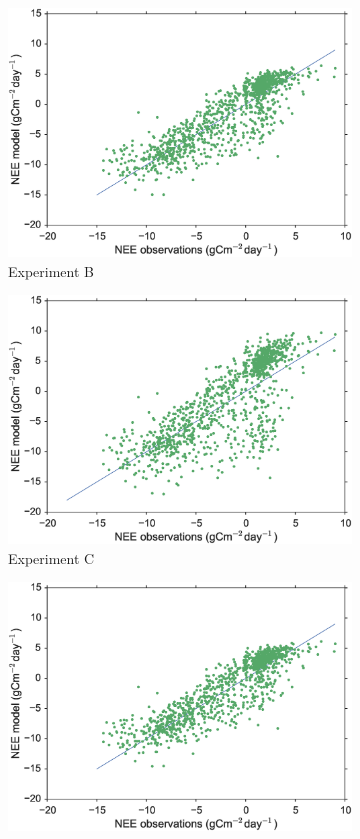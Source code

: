 \documentclass[review]{elsarticle}
\begin{document}
\begin{figure}
\begin{subfigure}[b]{0.49\textwidth}
        \includegraphics[width=\textwidth]{Bfscat.eps}
        \caption{Experiment B}
        \label{fig:forecastscatedcBR}
    \end{subfigure}
    \begin{subfigure}[b]{0.49\textwidth}
        \includegraphics[width=\textwidth]{Cfscat.eps}
        \caption{Experiment C}
        \label{fig:forecastscatBcorR}
    \end{subfigure}
    \begin{subfigure}[b]{0.49\textwidth}
        \includegraphics[width=\textwidth]{Dfscat.eps}

\end{subfigure}
\end{figure}
\end{document}
